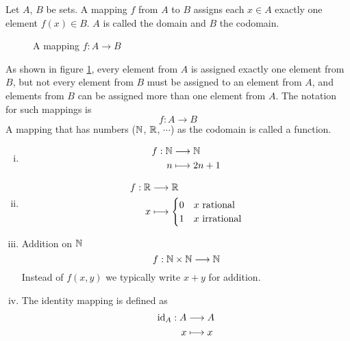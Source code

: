 \documentclass[../../script.tex]{subfiles}
\begin{document}
\begin{defi}
Let $A$, $B$ be sets. A mapping $f$ from $A$ to $B$ assigns each $x \in A$ exactly one element $f(x) \in B$. $A$ is called the domain and $B$ the codomain.

\begin{figure}[h]
\centering
{}
\caption{A mapping $f: A \rightarrow B$}
\label{fig:mapping}
\end{figure}
As shown in figure \ref{fig:mapping}, every element from $A$ is assigned exactly one element from $B$, but not every element from $B$ must be assigned to an element from $A$, and elements from $B$ can be assigned more than one element from $A$. The notation for such mappings is
\[
	f: A \longrightarrow B
\]
A mapping that has numbers ($\mathbb{N}$, $\mathbb{R}$, $\cdots$) as the codomain is called a function.
\end{defi}
\newpage
\begin{eg}\leavevmode
\begin{enumerate}[(i)]
	\item 
	\begin{align*}
		f: \mathbb{N} &\longrightarrow \mathbb{N} \\
		n &\longmapsto 2n + 1
	\end{align*}
	\item 
	\begin{align*}
		f: \mathbb{R} &\longrightarrow \mathbb{R} \\
		x &\longmapsto 
		\begin{cases}
			0 & x \text{ rational} \\
			1 & x \text{ irrational}
		\end{cases}
	\end{align*}
	\item Addition on $\mathbb{N}$
	\[
		f: \mathbb{N} \times \mathbb{N} \longrightarrow \mathbb{N}
	\]
	Instead of $f(x, y)$ we typically write $x + y$ for addition.
	\item The identity mapping is defined as
	\begin{align*}
		\text{id}_A: A &\longrightarrow A \\
		x &\longmapsto x
	\end{align*}
\end{enumerate}
\end{eg}
\end{document}
